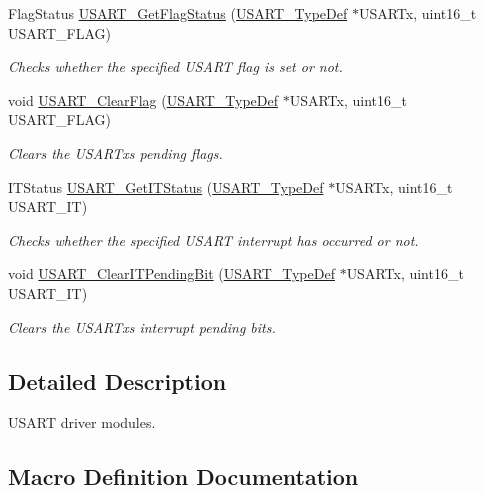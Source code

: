 \begin{DoxyCompactItemize}
Flag\+Status \hyperlink{group___u_s_a_r_t_ga144630722defc9e312f0ad280b68e9da}{U\+S\+A\+R\+T\+\_\+\+Get\+Flag\+Status} (\hyperlink{struct_u_s_a_r_t___type_def}{U\+S\+A\+R\+T\+\_\+\+Type\+Def} $\ast$U\+S\+A\+R\+Tx, uint16\+\_\+t U\+S\+A\+R\+T\+\_\+\+F\+L\+AG)
\begin{DoxyCompactList}\small\item\em Checks whether the specified U\+S\+A\+RT flag is set or not. \end{DoxyCompactList}\item 
void \hyperlink{group___u_s_a_r_t_gad962e148fc466ae1b45b288f6c91d966}{U\+S\+A\+R\+T\+\_\+\+Clear\+Flag} (\hyperlink{struct_u_s_a_r_t___type_def}{U\+S\+A\+R\+T\+\_\+\+Type\+Def} $\ast$U\+S\+A\+R\+Tx, uint16\+\_\+t U\+S\+A\+R\+T\+\_\+\+F\+L\+AG)
\begin{DoxyCompactList}\small\item\em Clears the U\+S\+A\+R\+Tx\textquotesingle{}s pending flags. \end{DoxyCompactList}\item 
I\+T\+Status \hyperlink{group___u_s_a_r_t_ga93d8f031241bcdbe938d091a85295445}{U\+S\+A\+R\+T\+\_\+\+Get\+I\+T\+Status} (\hyperlink{struct_u_s_a_r_t___type_def}{U\+S\+A\+R\+T\+\_\+\+Type\+Def} $\ast$U\+S\+A\+R\+Tx, uint16\+\_\+t U\+S\+A\+R\+T\+\_\+\+IT)
\begin{DoxyCompactList}\small\item\em Checks whether the specified U\+S\+A\+RT interrupt has occurred or not. \end{DoxyCompactList}\item 
void \hyperlink{group___u_s_a_r_t_ga1fc25d0338695063be5e50156955d9bc}{U\+S\+A\+R\+T\+\_\+\+Clear\+I\+T\+Pending\+Bit} (\hyperlink{struct_u_s_a_r_t___type_def}{U\+S\+A\+R\+T\+\_\+\+Type\+Def} $\ast$U\+S\+A\+R\+Tx, uint16\+\_\+t U\+S\+A\+R\+T\+\_\+\+IT)
\begin{DoxyCompactList}\small\item\em Clears the U\+S\+A\+R\+Tx\textquotesingle{}s interrupt pending bits. \end{DoxyCompactList}\end{DoxyCompactItemize}


\subsection{Detailed Description}
U\+S\+A\+RT driver modules. 



\subsection{Macro Definition Documentation}
\mbox{\label{group___u_s_a_r_t_ga8d425258898b4af4ebc820f52635fad8}} 
